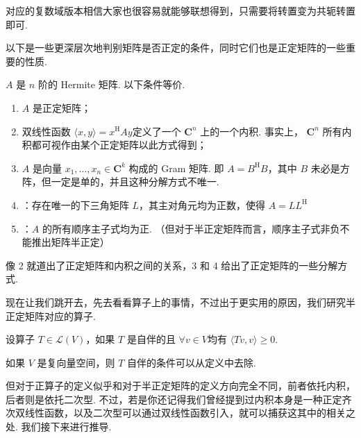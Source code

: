 对应的复数域版本相信大家也很容易就能够联想得到，只需要将转置变为共轭转置即可.

以下是一些更深层次地判别矩阵是否正定的条件，同时它们也是正定矩阵的一些重要的性质.

\begin{theorem}
    $ A $ 是 $ n $ 阶的 Hermite 矩阵. 以下条件等价.
    \begin{enumerate}
        \item $ A $ 是正定矩阵；

        \item 双线性函数 $ \langle x, y \rangle = x^\mathrm{H}Ay $定义了一个 $ \mathbf{C}^n $ 上的一个内积. 事实上， $ \mathbf{C}^n $ 所有内积都可视作由某个正定矩阵以此方式得到；

        \item $ A $ 是向量 $ x_1, \ldots , x_n \in \mathbf{C}^k $ 构成的
              Gram 矩阵. 即 $ A = B^\mathrm{H}B $，其中 $ B $ 未必是方阵，但一定是单的，并且这种分解方式不唯一.

        \item {}：存在唯一的下三角矩阵 $ L $，其主对角元均为正数，使得 $ A = LL^\mathrm{H} $

        \item {}：$ A $ 的所有顺序主子式均为正. （但对于半正定矩阵而言，顺序主子式非负不能推出矩阵半正定）
    \end{enumerate}
\end{theorem}

像 2 就道出了正定矩阵和内积之间的关系，3 和 4 给出了正定矩阵的一些分解方式.

现在让我们跳开去，先去看看算子上的事情，不过出于更实用的原因，我们研究半正定矩阵对应的算子.

\begin{definition}[正算子] 
    设算子 $ T \in \mathcal{L}(V) $，如果 $ T $ 是自伴的且 $ \forall v \in V $均有 $ \langle Tv, v \rangle \geqslant 0 $.
\end{definition}

如果 $ V $ 是复向量空间，则 $ T $ 自伴的条件可以从定义中去除.

但对于正算子的定义似乎和对于半正定矩阵的定义方向完全不同，前者依托内积，后者则是依托二次型. 不过，若是你还记得我们曾经提到过内积本身是一种正定齐次双线性函数，以及二次型可以通过双线性函数引入，就可以捕获这其中的相关之处. 我们接下来进行推导.

